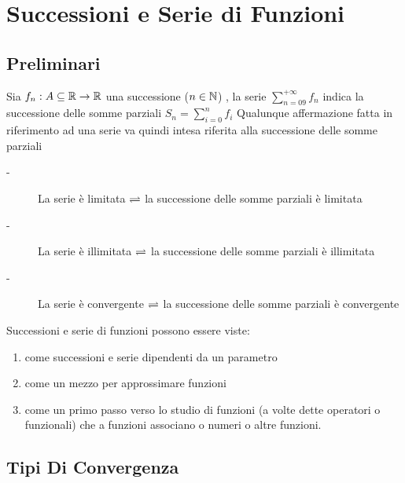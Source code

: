 \chapter{Successioni e Serie di Funzioni}
\section{Preliminari}
Sia $f_n:A\subseteq \mathbb{R}\to \mathbb{R}$ una successione ($n\in\mathbb{N}$) , la serie $\sum\limits_{n=09}^{+\infty}f_n$ indica la successione delle somme parziali $S_n = \sum\limits_{i=0}^nf_i$
\observation
Qualunque affermazione fatta in riferimento ad una serie va quindi intesa riferita alla successione delle somme parziali
\begin{description}
	\item[-] La serie è limitata $\rightleftharpoons$ la successione delle somme parziali è limitata
	\item[-] La serie è illimitata $\rightleftharpoons$ la successione delle somme parziali è illimitata
	\item[-] La serie è convergente $\rightleftharpoons$ la successione delle somme parziali è convergente
\end{description}
\observation
Successioni e serie di funzioni possono essere viste:
\begin{enumerate}
	\item come successioni e serie dipendenti da un parametro
	\item come un mezzo per approssimare funzioni
	\item come un primo passo verso lo studio di funzioni (a volte dette operatori o funzionali) che a funzioni associano o numeri o altre funzioni.
\end{enumerate}
\section{Tipi Di Convergenza}
